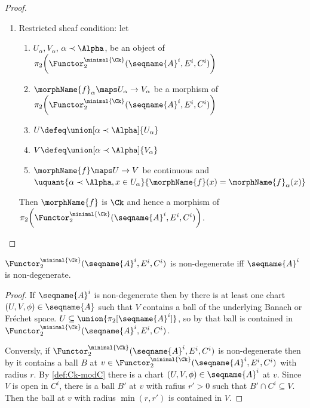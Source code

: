 \documentclass{article}
\begin{document}
\begin{lemma}
\begin{proof}
\begin{enumerate}
\item Restricted sheaf condition: let
\begin{enumerate}
\item $U_\alpha,V_\alpha$, $\alpha \prec \Alpha$, be an object of
$
\pi_2
  \biggl (
    \Functor^{\minimal{\Ck}}_2
      (\seqname{A}^i, E^i, C^i)
  \biggr )
$
\item $\morphName{f}_\alpha \maps U_\alpha \to V_\alpha$ be a morphism of
$
  \pi_2
    \biggl (
      \Functor^{\minimal{\Ck}}_2
        (\seqname{A}^i, E^i, C^i)
    \biggr )
$
\item $U \defeq \union[\alpha \prec \Alpha]{U_\alpha}$
\item $V \defeq \union[\alpha \prec \Alpha]{V_\alpha}$
\item $\morphName{f} \maps U \to V$ be continuous and
$
  \uquant
    {{\alpha \prec \Alpha},{x \in U_\alpha}}
    {\morphName{f}(x) = \morphName{f}_\alpha(x)}
$
\end{enumerate}
Then $\morphName{f}$ is $\Ck$ and hence a morphism of
$
  \pi_2
    \biggl (
      \Functor^{\minimal{\Ck}}_2
        (\seqname{A}^i, E^i, C^i)
    \biggr )
$.
\end{enumerate}
\end{proof}

$\Functor^{\minimal{\Ck}}_2 (\seqname{A}^i, E^i, C^i)$ is
non-degenerate iff $\seqname{A}^i$ is non-degenerate.

\begin{proof}
If $\seqname{A}^i$ is non-degenerate then by 
there is at least one chart $(U,V,\phi) \in \seqname{A}$ such that $V$
contains a ball of the underlying Banach or Fr\'echet space.
$U \subseteq \union{\pi_2[\seqname{A}^i]}$, so by 
that ball is contained in
$\Functor^{\minimal{\Ck}}_2 (\seqname{A}^i, E^i, C^i)$.

Conversly, if $\Functor^{\minimal{\Ck}}_2 (\seqname{A}^i, E^i, C^i)$ is
non-degenerate then by  it contains a ball $B$ at
$v \in \Functor^{\minimal{\Ck}}_2 (\seqname{A}^i, E^i, C^i)$
with radius $r$. By \cref{def:Ck-modC} there is a chart
$(U,V,\phi) \in \seqname{A}^i$ at $v$.  Since $V$ is open in $C^i$,
there is a ball $B'$ at $v$ with rafius $r' > 0$ such that
$B' \cap C^i \subseteq V$. Then the ball at $v$ with radius $\min(r,r')$
is contained in $V$.
\end{proof}


\end{lemma}
\end{document}
